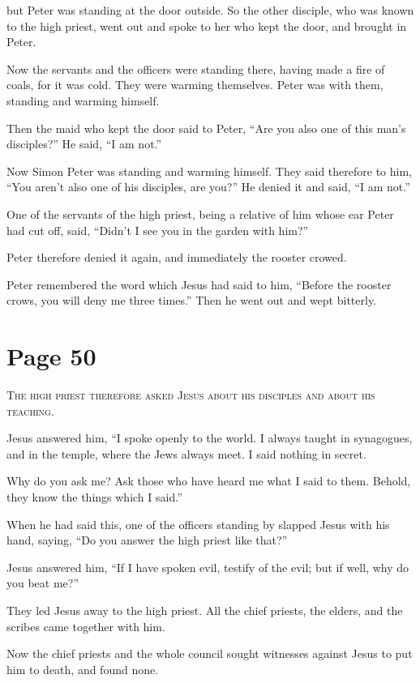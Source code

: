 but Peter was standing at the door outside. So the other disciple, who was known to the high priest, went out and spoke to her who kept the door, and brought in Peter.

Now the servants and the officers were standing there, having made a fire of coals, for it was cold. They were warming themselves. Peter was with them, standing and warming himself.

Then the maid who kept the door said to Peter, “Are you also one of this man’s disciples?” He said, “I am not.”

Now Simon Peter was standing and warming himself. They said therefore to him, “You aren’t also one of his disciples, are you?” He denied it and said, “I am not.”

One of the servants of the high priest, being a relative of him whose ear Peter had cut off, said, “Didn’t I see you in the garden with him?”

Peter therefore denied it again, and immediately the rooster crowed.

Peter remembered the word which Jesus had said to him, “Before the rooster crows, you will deny me three times.” Then he went out and wept bitterly.



\chapterornament
\section*{Page 50}

\lettrine{T}{he high priest therefore asked Jesus about his disciples and about his teaching.}

Jesus answered him, “I spoke openly to the world. I always taught in synagogues, and in the temple, where the Jews always meet. I said nothing in secret.

Why do you ask me? Ask those who have heard me what I said to them. Behold, they know the things which I said.”

When he had said this, one of the officers standing by slapped Jesus with his hand, saying, “Do you answer the high priest like that?”

Jesus answered him, “If I have spoken evil, testify of the evil; but if well, why do you beat me?”

They led Jesus away to the high priest. All the chief priests, the elders, and the scribes came together with him.

Now the chief priests and the whole council sought witnesses against Jesus to put him to death, and found none.

